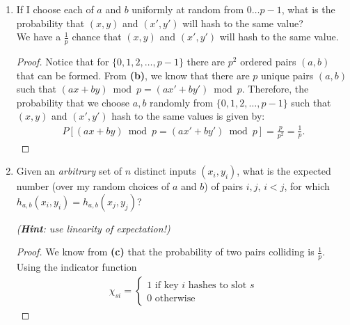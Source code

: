 \documentclass[11pt]{article}
\begin{document}
\begin{enumerate}
\begin{enumerate}
\begin{proof}
\begin{enumerate}
Let $x-x'=q$ and $y-y'=r$.  In this case, we have:
\begin{align*}
a(x-x')+b(y-y') =& \\
a(q)+b(r)=& 0 \bmod p
\end{align*}
By the hint in \textbf{(a)}, we know that because $q,r \neq 0$ are fixed, the equation $aq = z\bmod p$ has exactly one solution for every element $z\in \mathbb{Z}_p$.  Similarly, for every $z \in \mathbb{Z}_p$, there exists exactly one $-z \in \mathbb{Z}_p$ such that $-z + z =0$.  Therefore, as $a$ is allowed to vary, over the entire set, $b$ must be chosen uniquely such that $aq+br = 0 \bmod p$ holds.  Because there are $p$ possible choices for $a$ (i.e. every element in $\mathbb{Z}_p$), there are $p$ unique combinations $(a,b)$ such that $(ax+by) \bmod p = (ax'+by') \bmod p$. 
\end{enumerate}
\end{proof}
\item
If I choose each of $a$ and $b$ uniformly at random from $0 \ldots p-1$,
what is the probability that $(x,y)$ and $(x',y')$ will hash to the same value?  
\\
We have a $\frac{1}{p}$ chance that $(x,y)$ and $(x',y')$ will hash to the same value.
\begin{proof}
Notice that for $\{0,1,2,\ldots,p-1\}$ there are $p^2$ ordered pairs $(a,b)$ that can be formed.  From \textbf{(b)}, we know that there are $p$ unique pairs $(a,b)$ such that $(ax+by)\bmod p = (ax'+by') \bmod p$.  Therefore, the probability that we choose $a,b$ randomly from $\{0,1,2,\ldots,p-1\}$ such that $(x,y)$ and $(x',y')$ hash to the same values is given by:
\begin{align*}
P[(ax+by)\bmod p = (ax'+by')\bmod p] = \frac{p}{p^2} = \frac{1}{p}.
\end{align*}
\end{proof}
\item
Given an \emph{arbitrary} set of $n$ distinct inputs $(x_i, y_i)$,
what is the expected number (over my random choices of $a$ and $b$)
of pairs $i, j$, $i < j$, for which $h_{a,b}(x_i, y_i) = h_{a,b}(x_j,y_j)$?

\textit{(\textbf{Hint}: use linearity of expectation!)}

\begin{proof}
We know from \textbf{(c)} that the probability of two pairs colliding is $\frac{1}{p}$.  Using the indicator function 
\begin{align*}
\chi_{si} = 
\begin{cases}
1 \text{ if key } i \text{ hashes to slot } s \\
0 \text{  otherwise} 
\end{cases}
\end{align*}


\end{proof}
\end{enumerate}
\end{enumerate}
\end{document}
